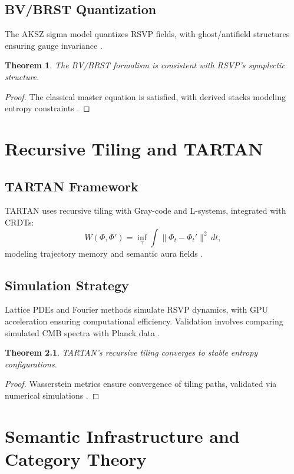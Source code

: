 \documentclass[12pt]{report}
\newtheorem{theorem}{Theorem}[chapter]
\newcommand{\PhiRSVP}{\Phi}
\begin{document}
\section{BV/BRST Quantization}
The AKSZ sigma model quantizes RSVP fields, with ghost/antifield structures ensuring gauge invariance \citep{AKSZ1997}.

\begin{theorem}
The BV/BRST formalism is consistent with RSVP’s symplectic structure.
\end{theorem}
\begin{proof}
The classical master equation is satisfied, with derived stacks modeling entropy constraints \citep{PTVV2013}.
\end{proof}

\chapter{Recursive Tiling and TARTAN}
\label{app:R}
\section{TARTAN Framework}
TARTAN uses recursive tiling with Gray-code and L-systems, integrated with CRDTs:
\begin{equation}
W(\PhiRSVP, \PhiRSVP') = \inf_{\gamma} \int \|\PhiRSVP_t - \PhiRSVP_t'\|^2 \, dt,
\end{equation}
modeling trajectory memory and semantic aura fields \citep{Villani2008}.

\section{Simulation Strategy}
Lattice PDEs and Fourier methods simulate RSVP dynamics, with GPU acceleration ensuring computational efficiency. Validation involves comparing simulated CMB spectra with Planck data \citep{Planck2020}.

\begin{theorem}
TARTAN’s recursive tiling converges to stable entropy configurations.
\end{theorem}
\begin{proof}
Wasserstein metrics ensure convergence of tiling paths, validated via numerical simulations \citep{Villani2008}.
\end{proof}

\chapter{Semantic Infrastructure and Category Theory}
\label{app:S}
\end{document}
